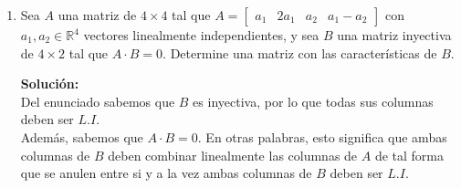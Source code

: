 \documentclass[12pt]{article}
\newenvironment{solucion}
{\begin{mdframed}[backgroundcolor=black!10]
		{\bf Solución:}\\
	}
	{
	\end{mdframed}
}
\newenvironment{preguntas}
{\begin{enumerate}\itemsep12pt
	}
	{
	\end{enumerate}
}
\newcommand{\R}{\mathbb{R}}
\begin{document}
\begin{preguntas}
\begin{solucion}
P.D. que si $B$ es $L.D.$, $AB$ también lo es\\
		\\
		Si las columnas de $B$ son $L.D.$, entonces
		$$\exists u \neq \vec{0}\ ( Bu = \vec{0})$$
		Luego,
		$$(AB)u = A(Bu) = A\vec{0} = \vec{0}$$
		$$(AB)u = \vec{0}$$
		Recordemos que $u \neq \vec{0}$, por lo que hay una combinación lineal no trivial de las columnas de $AB$ que da $\vec{0}$. Entonces, las columnas de $AB$ son $L.D.$
\end{solucion}
\item Sea $A$ una matriz de $4 \times 4$ tal que $A=\begin{bmatrix}a_1 & 2a_1 & a_2 & a_1-a_2\end{bmatrix}$ con $a_1, a_2 \in \R^4$ vectores linealmente independientes, y sea $B$ una matriz inyectiva de $4 \times 2$ tal que $A \cdot B = 0$. Determine una matriz con las características de $B$.
\begin{solucion}
Del enunciado sabemos que $B$ es inyectiva, por lo que todas sus columnas deben ser $L.I.$\\

Además, sabemos que $A\cdot B= 0$. En otras palabras, esto significa que ambas columnas de $B$ deben combinar linealmente las columnas de $A$ de tal forma que se anulen entre si y a la vez ambas columnas de $B$ deben ser $L.I.$\\


\end{solucion}
\end{preguntas}
\end{document}
